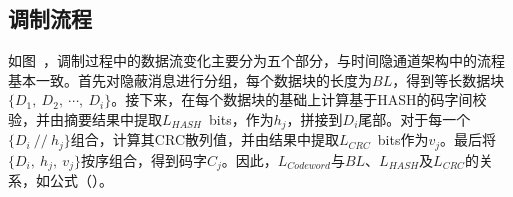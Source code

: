 \subsection{调制流程}
\label{chap:hash:designation:modulation}


如图\ ，调制过程中的数据流变化主要分为五个部分，与时间隐通道架构中的流程基本一致。首先对隐蔽消息进行分组，每个数据块的长度为$BL$，得到等长数据块$\{D_{1},\ D_{2},\ \cdots ,\ D_{i}\}$。接下来，在每个数据块的基础上计算基于HASH的码字间校验，并由摘要结果中提取{$L_{HASH}$\ bits}，作为$h_{j}$，拼接到$D_{i}$尾部。对于每一个$\{D_{i}\ //\ h_{j}\}$组合，计算其CRC散列值，并由结果中提取{$L_{CRC}$\ bits}作为$v_{j}$。最后将$\{D_{i},\ h_{j},\ v_{j}\}$按序组合，得到码字$C_{j}$。因此，$L_{Codeword}$与$BL$、$L_{HASH}$及$L_{CRC}$的关系，如公式（）。

